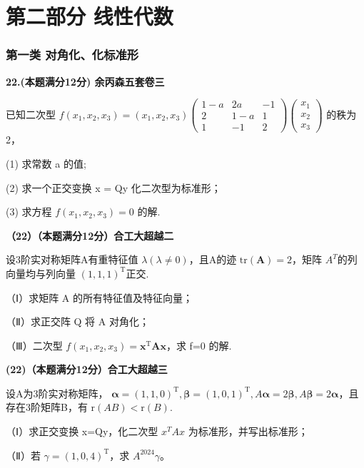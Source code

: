 \documentclass[a4paper,12pt]{article}
\begin{document}
\part{第二部分 线性代数}

\section{第一类 对角化、化标准形}

\textbf{22.(本题满分12分) 余丙森五套卷三}

已知二次型 $f(x_{1},x_{2},x_{3})=(x_{1},x_{2},x_{3})\begin{pmatrix}1-a&2a&-1\\2&1-a&1\\1&-1&2\end{pmatrix}\begin{pmatrix}x_{1}\\x_{2}\\x_{3}\end{pmatrix}$ 的秩为 2，

(1) 求常数 a 的值;

(2) 求一个正交变换 x = Qy 化二次型为标准形；

(3) 求方程 $f(x_{1}, x_{2}, x_{3}) = 0$ 的解.

\vspace{0.5cm}

\textbf{（22）（本题满分12分）合工大超越二}

设3阶实对称矩阵A有重特征值 $\lambda(\lambda\neq0)$，且A的迹 $\mathrm{tr}(\mathbf{A})=2$，矩阵 $A^{T}$的列向量均与列向量 $(1,1,1)^{\mathrm{T}}$正交.

（Ⅰ）求矩阵 A 的所有特征值及特征向量；

（Ⅱ）求正交阵 Q 将 A 对角化；

（Ⅲ）二次型 $f(x_{1},x_{2},x_{3})=\boldsymbol{x}^{\mathrm{T}}\boldsymbol{A}\boldsymbol{x}$，求 f=0 的解.

\vspace{0.5cm}

\textbf{(22)（本题满分12分）合工大超越三}

设A为3阶实对称矩阵， $\boldsymbol{\alpha}=(1,1,0)^{\mathrm{T}},\boldsymbol{\beta}=(1,0,1)^{\mathrm{T}},A\boldsymbol{\alpha}=2\boldsymbol{\beta},A\boldsymbol{\beta}=2\boldsymbol{\alpha}$，且存在3阶矩阵B，有 $\mathrm{r}(AB)<\mathrm{r}(B)$.

（Ⅰ）求正交变换 x=Qy，化二次型 $x^{T}Ax$ 为标准形，并写出标准形；

（Ⅱ）若 $\gamma=(1,0,4)^{\mathrm{T}}$，求 $A^{2024}\gamma$。
\end{document}
